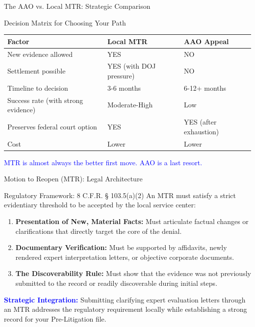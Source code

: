 \documentclass[11pt]{beamer}
\begin{document}
	\begin{frame}{The AAO vs. Local MTR: Strategic Comparison}
		\scriptsize
		\begin{block}{Decision Matrix for Choosing Your Path}
			\centering
			\begin{tabular}{|p{4cm}|p{3cm}|p{3cm}|}
				\hline
				\textbf{Factor} & \textbf{Local MTR} & \textbf{AAO Appeal} \\
				\hline
				New evidence allowed & YES & NO \\
				\hline
				Settlement possible & YES (with DOJ pressure) & NO \\
				\hline
				Timeline to decision & 3-6 months & 6-12+ months \\
				\hline
				Success rate (with strong evidence) & Moderate-High & Low \\
				\hline
				Preserves federal court option & YES & YES (after exhaustion) \\
				\hline
				Cost & Lower & Lower \\
				\hline
			\end{tabular}
			\vspace{0.2cm}
			\textcolor{blue}{MTR is almost always the better first move. AAO is a last resort.}
		\end{block}
	\end{frame}
	
	
	\begin{frame}{Motion to Reopen (MTR): Legal Architecture}
		\scriptsize
		\begin{block}{Regulatory Framework: 8 C.F.R. § 103.5(a)(2)}
			An MTR must satisfy a strict evidentiary threshold to be accepted by the local service center:
			\begin{enumerate}
				\item \textbf{Presentation of New, Material Facts:} Must articulate factual changes or clarifications that directly target the core of the denial.
				\item \textbf{Documentary Verification:} Must be supported by affidavits, newly rendered expert interpretation letters, or objective corporate documents.
				\item \textbf{The Discoverability Rule:} Must show that the evidence was not previously submitted to the record or readily discoverable during initial steps.
			\end{enumerate}
			\vspace{0.1cm}
			\textcolor{blue}{\textbf{Strategic Integration:}} Submitting clarifying expert evaluation letters through an MTR addresses the regulatory requirement locally while establishing a strong record for your Pre-Litigation file.
		\end{block}
	\end{frame}
	
\end{document}
